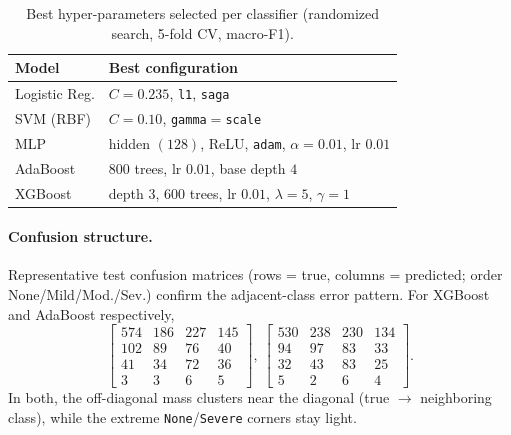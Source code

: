 \begin{table}[H]
\centering
\small
\caption{Best hyper-parameters selected per classifier (randomized search, 5-fold CV, macro-F1).}
\label{tab:cmi_clf_params}
\begin{tabular}{l p{}}
\hline
Model & Best configuration \\
\hline
Logistic Reg. & $C{=}0.235$, \texttt{l1}, \texttt{saga} \\
SVM (RBF)     & $C{=}0.10$, \texttt{gamma}$=$\texttt{scale} \\
MLP           & hidden $(128)$, ReLU, \texttt{adam}, $\alpha{=}0.01$, lr $0.01$ \\
AdaBoost      & $800$ trees, lr $0.01$, base depth $4$ \\
XGBoost       & depth $3$, $600$ trees, lr $0.01$, $\lambda{=}5$, $\gamma{=}1$ \\
\hline
\end{tabular}
\end{table}

\paragraph{Confusion structure.} Representative test confusion matrices (rows = true, columns = predicted; order None/Mild/Mod./Sev.) confirm the adjacent-class error pattern. For XGBoost and AdaBoost respectively,
{\setlength{\arraycolsep}{2.5pt}\small
\[
\begin{bmatrix} 574 & 186 & 227 & 145 \\ 102 & 89 & 76 & 40 \\ 41 & 34 & 72 & 36 \\ 3 & 3 & 6 & 5 \end{bmatrix}\!,~
\begin{bmatrix} 530 & 238 & 230 & 134 \\ 94 & 97 & 83 & 33 \\ 32 & 43 & 83 & 25 \\ 5 & 2 & 6 & 4 \end{bmatrix}\!.
\]}
In both, the off-diagonal mass clusters near the diagonal (true $\to$ neighboring class), while the extreme \texttt{None}/\texttt{Severe} corners stay light.

